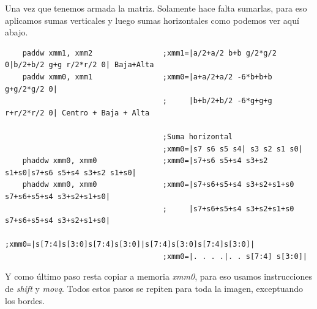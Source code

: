 Una vez que tenemos armada la matriz. Solamente hace falta sumarlas, para eso aplicamos sumas verticales y luego sumas horizontales
como podemos ver aquí abajo.

\begin{codesnippet}
\begin{verbatim}    
    paddw xmm1, xmm2                ;xmm1=|a/2+a/2 b+b g/2*g/2 0|b/2+b/2 g+g r/2*r/2 0| Baja+Alta
    paddw xmm0, xmm1                ;xmm0=|a+a/2+a/2 -6*b+b+b g+g/2*g/2 0| 
                                    ;     |b+b/2+b/2 -6*g+g+g r+r/2*r/2 0| Centro + Baja + Alta	

                                    ;Suma horizontal
                                    ;xmm0=|s7 s6 s5 s4| s3 s2 s1 s0|
    phaddw xmm0, xmm0               ;xmm0=|s7+s6 s5+s4 s3+s2 s1+s0|s7+s6 s5+s4 s3+s2 s1+s0|
    phaddw xmm0, xmm0               ;xmm0=|s7+s6+s5+s4 s3+s2+s1+s0 s7+s6+s5+s4 s3+s2+s1+s0|
                                    ;     |s7+s6+s5+s4 s3+s2+s1+s0 s7+s6+s5+s4 s3+s2+s1+s0|  
                                    ;xmm0=|s[7:4]s[3:0]s[7:4]s[3:0]|s[7:4]s[3:0]s[7:4]s[3:0]|
                                    ;xmm0=|. . . .|. . s[7:4] s[3:0]|
\end{verbatim}
\end{codesnippet}

Y como último paso resta copiar a memoria \emph{xmm0}, para eso usamos instrucciones de \emph{shift} y \emph{movq}.
Todos estos pasos se repiten para toda la imagen, exceptuando los bordes.
